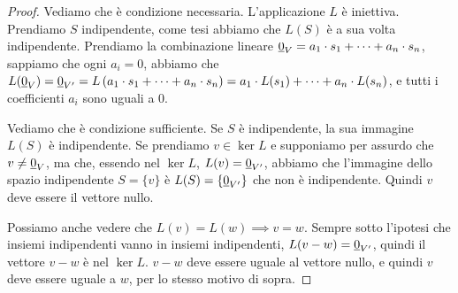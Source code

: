 \begin{proof}
Vediamo che \`e condizione necessaria. L'applicazione $L$ \`e iniettiva. Prendiamo $S$ indipendente, come tesi abbiamo che $L(S)$ \`e a sua volta indipendente. Prendiamo la combinazione lineare $\underline{0}_V = a_1 \cdot s_1 + \dots + a_n \cdot s_n$, sappiamo che ogni $a_i = 0$, abbiamo che $L(\underline{0}_V) = \underline{0}_{V'} = L \left( a_1 \cdot s_1 + \dots + a_n \cdot s_n \right) = a_1 \cdot L(s_1) + \dots + a_n \cdot L(s_n)$, e tutti i coefficienti $a_i$ sono uguali a 0.

Vediamo che \`e condizione sufficiente. Se $S$ \`e indipendente, la sua immagine $L(S)$ \`e indipendente. Se prendiamo $v \in \ker L$ e supponiamo per assurdo che $v \neq \underline{0}_V$, ma che, essendo nel $\ker L$, $L(v) = \underline{0}_{V'}$, abbiamo che l'immagine dello spazio indipendente $S = \{ v \}$ \`e $L(S) = \{ \underline{0}_{V'} \}$ che non \`e indipendente. Quindi $v$ deve essere il vettore nullo.

Possiamo anche vedere che $L(v) = L(w) \implies v = w$. Sempre sotto l'ipotesi che insiemi indipendenti vanno in insiemi indipendenti, $L(v - w) = \underline{0}_{V'}$, quindi il vettore $v - w$ \`e nel $\ker L$. $v - w$ deve essere uguale al vettore nullo, e quindi $v$ deve  essere uguale a $w$, per lo stesso motivo di sopra.
\end{proof}


